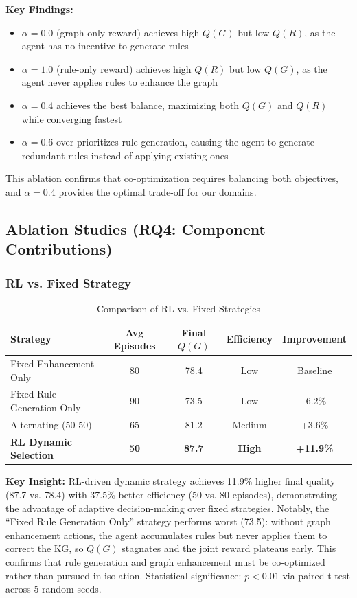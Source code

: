 \documentclass[runningheads]{llncs}
\begin{document}
\textbf{Key Findings:}
\begin{itemize}
    \item $\alpha=0.0$ (graph-only reward) achieves high $Q(G)$ but low $Q(R)$, as the agent has no incentive to generate rules
    \item $\alpha=1.0$ (rule-only reward) achieves high $Q(R)$ but low $Q(G)$, as the agent never applies rules to enhance the graph
    \item $\alpha=0.4$ achieves the best balance, maximizing both $Q(G)$ and $Q(R)$ while converging fastest
    \item $\alpha=0.6$ over-prioritizes rule generation, causing the agent to generate redundant rules instead of applying existing ones
\end{itemize}

This ablation confirms that co-optimization requires balancing both objectives, and $\alpha=0.4$ provides the optimal trade-off for our domains.

\subsection{Ablation Studies (RQ4: Component Contributions)}

\subsubsection{RL vs. Fixed Strategy}

\begin{table}[H]
    \centering
    \caption{Comparison of RL vs. Fixed Strategies}
    \label{tab:rl_ablation}
    \begin{tabular}{l c c c c}
    \toprule
    Strategy & Avg Episodes & Final $Q(G)$ & Efficiency & Improvement \\
    \midrule
    Fixed Enhancement Only & 80 & 78.4 & Low & Baseline \\
    Fixed Rule Generation Only & 90 & 73.5 & Low & -6.2\% \\
    Alternating (50-50) & 65 & 81.2 & Medium & +3.6\% \\
    \textbf{RL Dynamic Selection} & \textbf{50} & \textbf{87.7} & \textbf{High} & \textbf{+11.9\%} \\
    \bottomrule
    \end{tabular}
\end{table}

\textbf{Key Insight:} RL-driven dynamic strategy achieves 11.9\% higher final quality (87.7 vs. 78.4) with 37.5\% better efficiency (50 vs. 80 episodes), demonstrating the advantage of adaptive decision-making over fixed strategies. Notably, the ``Fixed Rule Generation Only'' strategy performs worst (73.5): without graph enhancement actions, the agent accumulates rules but never applies them to correct the KG, so $Q(G)$ stagnates and the joint reward plateaus early. This confirms that rule generation and graph enhancement must be co-optimized rather than pursued in isolation. Statistical significance: $p < 0.01$ via paired t-test across 5 random seeds.
\end{document}
